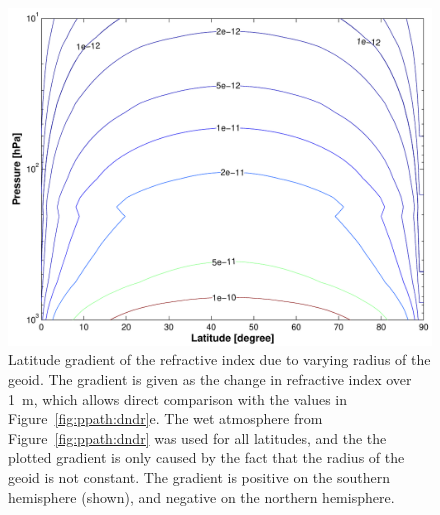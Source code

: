 \begin{figure}[!t]
 \begin{center}
  \includegraphics*[width=0.85\hsize]{Figs/ppath/ppath_dndlat}
  \caption{Latitude gradient of the refractive index due to varying radius 
    of the geoid. The gradient is given as the change in refractive
    index over 1~m, which allows direct comparison with the values in
    Figure~\ref{fig:ppath:dndr}e. The wet atmosphere from
    Figure~\ref{fig:ppath:dndr} was used for all latitudes, and the
    the plotted gradient is only caused by the fact that the radius of
    the geoid is not constant.  The gradient is positive on the
    southern hemisphere (shown), and negative on the northern
    hemisphere.}
  \label{fig:ppath:dndlat}  
 \end{center}
\end{figure}

